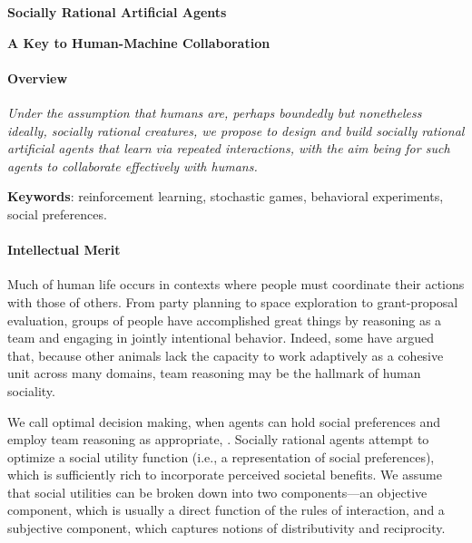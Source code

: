 
\centerline{\Large \bf Socially Rational Artificial Agents}

\vspace{\down}
\centerline{\large \bf A Key to Human-Machine Collaboration}

\vspace{\up}
\paragraph{Overview}

\emph{Under the assumption that humans are, perhaps boundedly
  but nonetheless ideally, socially rational creatures, we propose to
  design and build socially rational artificial agents that learn via
  repeated interactions, with the aim being for such agents to
  collaborate effectively with humans.}



{\bf Keywords}: reinforcement learning, stochastic games, behavioral experiments, social preferences.

\vspace{\up}
\paragraph{Intellectual Merit}

Much of human life occurs in contexts where people must coordinate
their actions with those of others.  From party planning to space
exploration to grant-proposal evaluation, groups of people have
accomplished great things by reasoning as a team and engaging in
jointly intentional behavior.  Indeed, some have argued that, because
other animals lack the capacity to work adaptively as a cohesive
unit across many domains, team reasoning may be the hallmark of human
sociality.

We call optimal decision making, when agents can hold social
preferences and employ team reasoning as appropriate, .  Socially rational agents attempt to optimize a
social utility function (i.e., a representation of social
preferences), which is sufficiently rich to incorporate perceived
societal benefits.  We assume that social utilities can be broken down
into two components---an objective component, which is usually a
direct function of the rules of interaction, and a subjective
component, which captures notions of distributivity and reciprocity.

